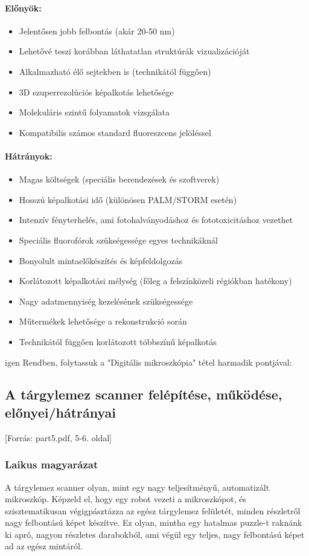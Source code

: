 \documentclass[a4paper,12pt]{article}
\begin{document}
\paragraph{Előnyök:} \begin{itemize} \item Jelentősen jobb felbontás (akár 20-50 nm) \item Lehetővé teszi korábban láthatatlan struktúrák vizualizációját \item Alkalmazható élő sejtekben is (technikától függően) \item 3D szuperrezolúciós képalkotás lehetősége \item Molekuláris szintű folyamatok vizsgálata \item Kompatibilis számos standard fluoreszcens jelöléssel \end{itemize}

\paragraph{Hátrányok:} \begin{itemize} \item Magas költségek (speciális berendezések és szoftverek) \item Hosszú képalkotási idő (különösen PALM/STORM esetén) \item Intenzív fényterhelés, ami fotohalványodáshoz és fototoxicitáshoz vezethet \item Speciális fluorofórok szükségessége egyes technikáknál \item Bonyolult mintaelőkészítés és képfeldolgozás \item Korlátozott képalkotási mélység (főleg a felszínközeli régiókban hatékony) \item Nagy adatmennyiség kezelésének szükségessége \item Műtermékek lehetősége a rekonstrukció során \item Technikától függően korlátozott többszínű képalkotás \end{itemize}

igen
Rendben, folytassuk a "Digitális mikroszkópia" tétel harmadik pontjával:

\subsection{A tárgylemez scanner felépítése, működése, előnyei/hátrányai} [Forrás: part5.pdf, 5-6. oldal]

\subsubsection{Laikus magyarázat} A tárgylemez scanner olyan, mint egy nagy teljesítményű, automatizált mikroszkóp. Képzeld el, hogy egy robot vezeti a mikroszkópot, és szisztematikusan végigpásztázza az egész tárgylemez felületét, minden részletről nagy felbontású képet készítve. Ez olyan, mintha egy hatalmas puzzle-t raknánk ki apró, nagyon részletes darabokból, ami végül egy teljes, nagy felbontású képet ad az egész mintáról.
\end{document}
